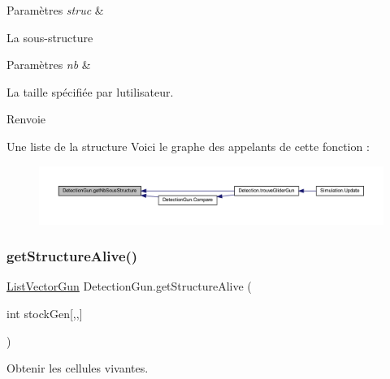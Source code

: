\begin{DoxyParams}{Paramètres}
{\em struc} & \\
\hline
\end{DoxyParams}
La sous-\/structure 
\begin{DoxyParams}{Paramètres}
{\em nb} & \\
\hline
\end{DoxyParams}
La taille spécifiée par l\textquotesingle{}utilisateur. \begin{DoxyReturn}{Renvoie}

\end{DoxyReturn}
Une liste de la structure Voici le graphe des appelants de cette fonction \+:
\nopagebreak
\begin{figure}[H]
\begin{center}
\leavevmode
\includegraphics[width=350pt]{class_detection_gun_a0a14866d2727aea5d457121bd646f3bb_icgraph}
\end{center}
\end{figure}
\mbox{\label{class_detection_gun_a488d963e0b78922904b6bd42182ca7b1}} 
\subsubsection{\texorpdfstring{get\+Structure\+Alive()}{getStructureAlive()}}
{\footnotesize\ttfamily \mbox{\hyperlink{class_list_vector_gun}{List\+Vector\+Gun}} Detection\+Gun.\+get\+Structure\+Alive (\begin{DoxyParamCaption}\item[{int}]{stock\+Gen\mbox{[},,\mbox{]} }\end{DoxyParamCaption})\hspace{0.3cm}{\ttfamily [inline]}}



Obtenir les cellules vivantes. 


